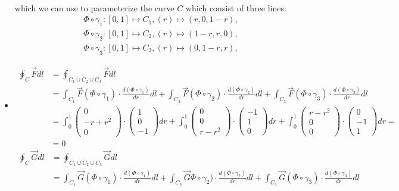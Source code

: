 \documentclass[11pt]{article}
\begin{document}
\begin{solution}
\begin{itemize}
\begin{align*}
	\end{align*}
	which we can use to parameterize the curve $C$ which consist of three lines:
	\begin{align*}
	&\Phi\circ\gamma_1 : [0,1]\mapsto C_1, (r) \mapsto (r,0,1-r),\\
	&\Phi\circ\gamma_2 : [0,1]\mapsto C_2, (r) \mapsto (1-r,r,0),\\
	&\Phi\circ\gamma_3 : [0,1]\mapsto C_3, (r) \mapsto (0,1-r,r),
	\end{align*}
    \item 
	\begin{align*}
	\oint_C \vec F dl &= \oint_{C_1 \cup C_2 \cup C_3} \vec F dl\\
	&= \int_{C_1} \vec F(\Phi\circ \gamma_1) \cdot \frac{d(\Phi\circ \gamma_1)}{dr}dl + \int_{C_2} \vec F(\Phi\circ \gamma_2) \cdot \frac{d(\Phi\circ \gamma_2)}{dr}dl + \int_{C_3} \vec F(\Phi\circ \gamma_3) \cdot \frac{d(\Phi\circ \gamma_3)}{dr}dl\\
	&= \int_0^1 \begin{pmatrix}0\\-r+r^2\\0\end{pmatrix}\cdot\begin{pmatrix}1\\0\\-1\end{pmatrix}dr + \int_0^1 \begin{pmatrix}0\\0\\r-r^2\end{pmatrix}\cdot\begin{pmatrix}-1\\1\\0\end{pmatrix}dr + \int_0^1 \begin{pmatrix}r-r^2\\0\\0\end{pmatrix}\cdot\begin{pmatrix}0\\-1\\1\end{pmatrix}dr =\\
	&=0
	\end{align*}
	\begin{align*}
	\oint_C \vec G dl &= \oint_{C_1 \cup C_2 \cup C_3} \vec G dl\\
	&= \int_{C_1} \vec G(\Phi\circ \gamma_1) \cdot \frac{d(\Phi\circ \gamma_1)}{dr}dl + \int_{C_2} \vec G\Phi\circ \gamma_2) \cdot \frac{d(\Phi\circ \gamma_2)}{dr}dl + \int_{C_3} \vec G(\Phi\circ \gamma_3) \cdot \frac{d(\Phi\circ \gamma_3)}{dr}dl\\

\end{align*}
\end{itemize}
\end{solution}
\end{document}
